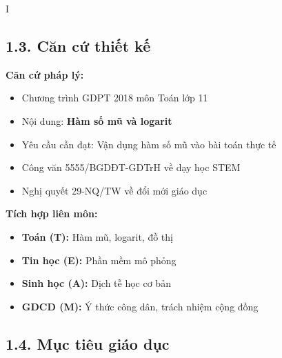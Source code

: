 \documentclass[12pt,a4paper]{article}
\begin{document}
\begin{competitionsection}{I}
\subsection*{1.3. Căn cứ thiết kế}

\begin{minipage}[t]{0.48\textwidth}
\textbf{\color{primary}Căn cứ pháp lý:}
\begin{itemize}
\item Chương trình GDPT 2018 môn Toán lớp 11
\item Nội dung: \textbf{Hàm số mũ và logarit}
\item Yêu cầu cần đạt: Vận dụng hàm số mũ vào bài toán thực tế
\item Công văn 5555/BGDĐT-GDTrH về dạy học STEM
\item Nghị quyết 29-NQ/TW về đổi mới giáo dục
\end{itemize}
\end{minipage}
\hfill
\begin{minipage}[t]{0.48\textwidth}
\textbf{\color{primary}Tích hợp liên môn:}
\begin{itemize}
\item \textbf{Toán (T):} Hàm mũ, logarit, đồ thị
\item \textbf{Tin học (E):} Phần mềm mô phỏng
\item \textbf{Sinh học (A):} Dịch tễ học cơ bản
\item \textbf{GDCD (M):} Ý thức công dân, trách nhiệm cộng đồng
\end{itemize}
\end{minipage}

\subsection*{1.4. Mục tiêu giáo dục}


\end{competitionsection}
\end{document}
